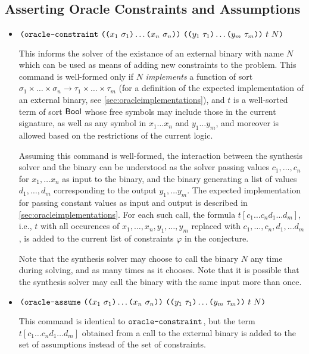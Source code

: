 \documentclass[english,a4paper,10pt]{article}
\begin{document}
\subsection{Asserting Oracle Constraints and Assumptions}
\begin{itemize}
\item $\texttt{(}\texttt{oracle-constraint}\mbox{ }  
\texttt{(}\texttt{(}x_1\mbox{ }\sigma_1\texttt{)} \ldots \texttt{(}x_n\mbox{ }\sigma_n\texttt{)}\texttt{)}\mbox{ }
\texttt{(}\texttt{(}y_{1}\mbox{ }\tau_{1}\texttt{)} \ldots \texttt{(}y_{m}\mbox{ }\tau_{m}\texttt{)}\texttt{)}  \mbox{ } t \mbox{ } N \texttt{)}$

This informs the solver of the existance of an external binary with name $N$
which can be used as means of adding new constraints to the problem.
This command is well-formed only if $N$
\emph{implements} a function of sort $\sigma_1 \times \ldots \times \sigma_n \rightarrow \tau_{1} \times \ldots \times \tau_{m}$
(for a definition of the expected implementation of an external binary, see \cref{sec:oracleimplementations}),
and $t$ is a well-sorted term of sort $\mathsf{Bool}$ 
whose free symbols may include those in the current signature, as well as any symbol in $x_1 \ldots x_{n}$ and $y_1 \ldots y_{m}$,
and moreover is allowed based on the restrictions of the current logic.

Assuming this command is well-formed,
the interaction between the synthesis solver and the binary
can be understood as the solver passing values
$c_1, \ldots, c_n$ for $x_1, \ldots x_n$ as input to the binary,
and the binary generating a list of values
$d_{1}, \ldots, d_{m}$ corresponding to the output $y_{1}, \ldots y_{m}$.
The expected implementation for passing
constant values as input and output 
is described in \cref{sec:oracleimplementations}.
For each such call,
the formula $t[c_1 \ldots c_{n} d_1 \ldots d_m]$, i.e., 
$t$ with all occurences of $x_1, \ldots, x_{n}, y_1, \ldots, y_m$ replaced with $c_1, \ldots, c_{n}, d_1, \ldots d_m$, 
is added to the current list of constraints $\varphi$ in the conjecture.

Note that 
the synthesis solver may choose to call the binary $N$ 
any time during solving, and as many times as it chooses.
Note that it is possible that the synthesis solver may call the binary with
the same input more than once.

\item 
$\texttt{(}\texttt{oracle-assume}\mbox{ }
\texttt{(}\texttt{(}x_1\mbox{ }\sigma_1\texttt{)} \ldots \texttt{(}x_n\mbox{ }\sigma_n\texttt{)}\texttt{)}\mbox{ }
\texttt{(}\texttt{(}y_{1}\mbox{ }\tau_{1}\texttt{)} \ldots \texttt{(}y_{m}\mbox{ }\tau_{m}\texttt{)}\texttt{)}  \mbox{ } t \mbox{ } N \texttt{)}$

This command is identical to $\texttt{oracle-constraint}$,
but the term $t[c_1 \ldots c_{n} d_1 \ldots d_m]$ obtained from a call to the external binary
is added to the set of assumptions instead of the set of constraints.

\end{itemize}
\end{document}
